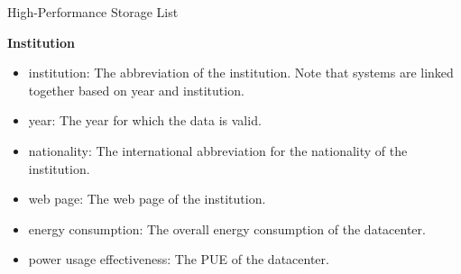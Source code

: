 \documentclass[portrait,a0paper,fontscale=0.4]{baposter}
\newcommand{\compresslist}{%
\setlength{\itemsep}{1pt}%
\setlength{\parskip}{0pt}%
\setlength{\parsep}{0pt}%
}
\begin{document}
\begin{poster}
\begin{posterbox}[name=schedule,column=1,span=2, below=concept]{High-Performance Storage List}
\begin{minipage}{0.48\textwidth}
\textbf{Institution}
\scriptsize
\begin{itemize}\compresslist
\item institution: The abbreviation of the institution. Note that systems are linked together based on year and institution.
\item year: The year for which the data is valid.
\item nationality: The international abbreviation for the nationality of the institution.
\item web page: The web page of the institution.
\item energy consumption: The overall energy consumption of the datacenter.
\item power usage effectiveness: The PUE of the datacenter.
\end{itemize}


\end{minipage}
\end{posterbox}
\end{poster}
\end{document}
